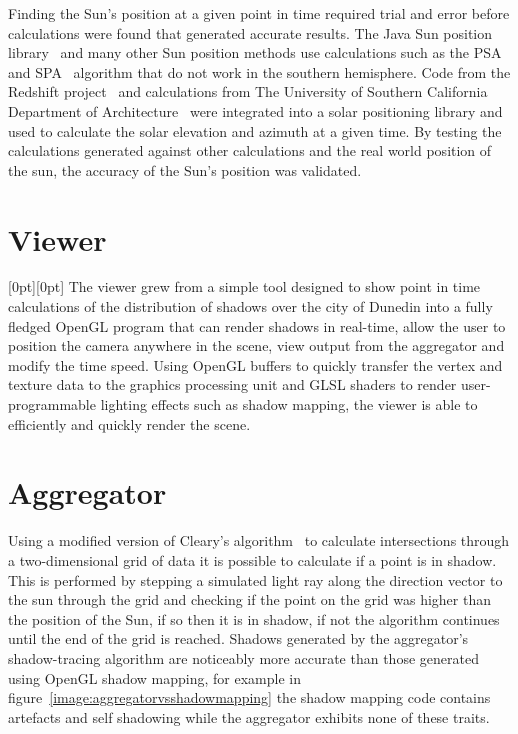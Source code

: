 \documentclass[12pt]{report}
\newcommand{\note}[1]{\raisebox{0pt}[0pt][0pt]{\pdfcomment[open=true]{#1}}}
\begin{document}
Finding the Sun's position at a given point in time required trial and error before calculations were found that generated accurate results. The Java Sun position library~\cite{javasunlib} and many other Sun position methods use calculations such as the PSA~\cite{psa} and SPA~\cite{spa} algorithm that do not work in the southern hemisphere\cite{southsun}. Code from the Redshift project~\cite{redshift} and calculations from The University of Southern California Department of Architecture~\cite{solarazi} were integrated into a solar positioning library and used to calculate the solar elevation and azimuth at a given time. By testing the calculations generated against other calculations and the real world position of the sun, the accuracy of the Sun's position was validated.


\section{Viewer}\note{Should I change these headings?}
The viewer grew from a simple tool designed to show point in time calculations of the distribution of shadows over the city of Dunedin into a fully fledged OpenGL program that can render shadows in real-time, allow the user to position the camera anywhere in the scene, view output from the aggregator and modify the time speed. Using OpenGL buffers to quickly transfer the vertex and texture data to the graphics processing unit and GLSL shaders to render user-programmable lighting effects such as shadow mapping, the viewer is able to efficiently and quickly render the scene.

\section{Aggregator}
Using a modified version of Cleary's algorithm~\cite{cleary} to calculate intersections through a two-dimensional grid of data it is possible to calculate if a point is in shadow. This is performed by stepping a simulated light ray along the direction vector to the sun through the grid and checking if the point on the grid was higher than the position of the Sun, if so then it is in shadow, if not the algorithm continues until the end of the grid is reached. Shadows generated by the aggregator's shadow-tracing algorithm are noticeably more accurate than those generated using OpenGL shadow mapping, for example in figure~\ref{image:aggregatorvsshadowmapping} the shadow mapping code contains artefacts and self shadowing while the aggregator exhibits none of these traits.
\end{document}
